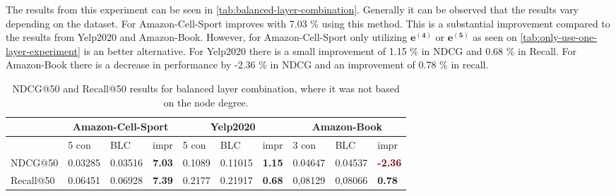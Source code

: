 The results from this experiment can be seen in \autoref{tab:balanced-layer-combination}.
Generally it can be observed that the results vary depending on the dataset.
For Amazon-Cell-Sport improves with 7.03 \% using this method.
This is a substantial improvement compared to the results from Yelp2020 and Amazon-Book.
However, for Amazon-Cell-Sport only utilizing $\mathbf{e^{(4)}}$ or $\mathbf{e^{(5)}}$ as seen on \autoref{tab:only-use-one-layer-experiment} is an better alternative.
For Yelp2020 there is a small improvement of 1.15 \% in NDCG and 0.68 \% in Recall.
For Amazon-Book there is a decrease in performance by -2.36 \% in NDCG and an improvement of 0.78 \% in recall.

\begin{table*}[h!]
    \centering
    \begin{tabular}{|l|r|r|r||l|r|r||l|l|l|}
        \hline
                  & \multicolumn{3}{c||}{Amazon-Cell-Sport} & \multicolumn{3}{c||}{Yelp2020} & \multicolumn{3}{c|}{Amazon-Book}                                                                                                                                              \\ \hline
                  & \multicolumn{1}{l|}{5 con}              & \multicolumn{1}{l|}{BLC}       & \multicolumn{1}{l||}{impr}            & 5 con  & \multicolumn{1}{l|}{BLC} & \multicolumn{1}{l||}{impr}            & 3 con   & BLC     & impr                                  \\ \hline
        NDCG@50   & 0.03285                                 & 0.03516                        & \textbf{\textcolor{OliveGreen}{7.03}} & 0.1089 & 0.11015                  & \textbf{\textcolor{OliveGreen}{1.15}} & 0.04647 & 0.04537 & \textbf{\textcolor{Maroon}{-2.36}}    \\ \hline
        Recall@50 & 0.06451                                 & 0.06928                        & \textbf{\textcolor{OliveGreen}{7.39}} & 0.2177 & 0.21917                  & \textbf{\textcolor{OliveGreen}{0.68}} & 0,08129 & 0,08066 & \textbf{\textcolor{OliveGreen}{0.78}} \\ \hline
    \end{tabular}
    \caption{NDCG@50 and Recall@50 results for balanced layer combination, where it was not based on the node degree.}
    \label{tab:balanced-layer-effect}
\end{table*}

